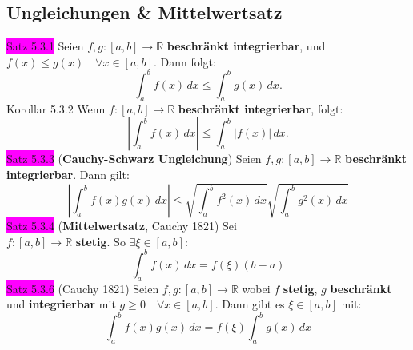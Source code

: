 \documentclass[landscape, 10pt]{article}
\newcommand{\R}{\mathbb{R}}
\begin{document}
\begin{multicols}{3}
       \subsection{Ungleichungen \& Mittelwertsatz}
              \colorbox{magenta}{Satz 5.3.1} 
                     Seien \textcolor{NavyBlue}{
                     $f,g:[a,b]\longrightarrow\R$}
                     \textbf{beschränkt integrierbar}, und 
                     \textcolor{NavyBlue}{
                     $f(x)\leqslant g(x)\quad\forall x\in[a,b]$}.
                     Dann folgt: 
                     \begin{equation*}
                            \int_a^bf(x)\,dx
                            \leqslant\int_a^bg(x)\,dx.
                     \end{equation*}
              \colorbox{BurntOrange}{Korollar 5.3.2} 
                     Wenn \textcolor{NavyBlue}{
                     $f:[a,b]\longrightarrow\R$} 
                     \textbf{beschränkt integrierbar}, folgt:
                     \begin{equation*}
                            |\int_a^bf(x)\,dx|
                            \leqslant\int_a^b|f(x)|\,dx. 
                     \end{equation*}
              \colorbox{magenta}{Satz 5.3.3} 
              (\textbf{Cauchy-Schwarz Ungleichung}) 
                     Seien \textcolor{NavyBlue}{
                     $f,g:[a,b]\longrightarrow\R$}
                     \textbf{beschränkt integrierbar}. 
                     Dann gilt: 
                     \begin{equation*}
                            |\int_a^bf(x)g(x)\,dx|
                            \leqslant\sqrt{\int_a^bf^2(x)\,dx}
                            \sqrt{\int_a^bg^2(x)\,dx}
                     \end{equation*}
              \colorbox{magenta}{Satz 5.3.4} 
              (\textbf{Mittelwertsatz}, Cauchy 1821) 
                     Sei \\ \textcolor{NavyBlue}{
                     $f:[a,b]\longrightarrow\R$} 
                     \textbf{stetig}. So 
                     \textcolor{NavyBlue}{
                     $\exists\xi\in[a,b]$}:
                     \begin{equation*}
                            \int_a^bf(x)\,dx=f(\xi)(b-a)
                     \end{equation*}
              \colorbox{magenta}{Satz 5.3.6} 
              (Cauchy 1821) 
                     Seien \textcolor{NavyBlue}{
                     $f,g:[a,b]\longrightarrow\R$} wobei 
                     \textcolor{NavyBlue}{$f$} 
                     \textbf{stetig}, 
                     \textcolor{NavyBlue}{$g$} 
                     \textbf{beschränkt} und 
                     \textbf{integrierbar} mit 
                     \textcolor{NavyBlue}{
                     $g\geqslant0\quad\forall x\in[a,b]$}. 
                     Dann gibt es 
                     \textcolor{NavyBlue}{$\xi\in[a,b]$} mit:
                     \begin{equation*}
                            \int_a^bf(x)g(x)\,dx
                            =f(\xi)\int_a^bg(x)\,dx
                     \end{equation*}

\end{multicols}
\end{document}
